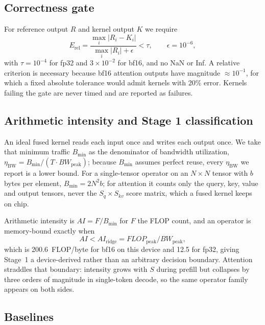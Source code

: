 \documentclass[10pt,twocolumn]{article}
\begin{document}
\subsection{Correctness gate}

For reference output $R$ and kernel output $K$ we require
\begin{equation}
E_{\text{rel}}=\frac{\max_i|R_i-K_i|}{\max_i|R_i|+\epsilon}<\tau,
\qquad \epsilon=10^{-6},
\end{equation}
with $\tau=10^{-4}$ for fp32 and $3\times10^{-2}$ for bf16, and no NaN or Inf. A
relative criterion is necessary because bf16 attention outputs have magnitude
${\approx}10^{-1}$, for which a fixed absolute tolerance would admit kernels with 20\%
error. Kernels failing the gate are never timed and are reported as failures.

\subsection{Arithmetic intensity and Stage 1 classification}

An ideal fused kernel reads each input once and writes each output once. We take that
minimum traffic $B_{\min}$ as the denominator of bandwidth utilization,
$\eta_{\text{BW}}=B_{\min}/(T\!\cdot\!BW_{\text{peak}})$; because $B_{\min}$ assumes
perfect reuse, every $\eta_{\text{BW}}$ we report is a lower bound. For a single-tensor
operator on an $N{\times}N$ tensor with $b$ bytes per element, $B_{\min}=2N^2b$; for
attention it counts only the query, key, value and output tensors, never the
$S_q{\times}S_{kv}$ score matrix, which a fused kernel keeps on chip.

Arithmetic intensity is $AI=F/B_{\min}$ for $F$ the FLOP count, and an operator is
memory-bound exactly when
\begin{equation}
AI<AI_{\text{ridge}}=FLOP_{\text{peak}}/BW_{\text{peak}},
\end{equation}
which is 200.6~FLOP/byte for bf16 on this device and 12.5 for fp32, giving Stage~1 a
device-derived rather than an arbitrary decision boundary. Attention straddles that
boundary: intensity grows with $S$ during prefill but collapses by three orders of
magnitude in single-token decode, so the same operator family appears on both sides.

\subsection{Baselines}
\end{document}
